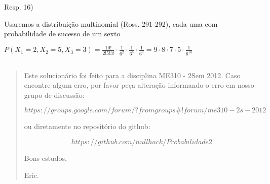 \documentclass[portuguese]{article}
\begin{document}
Resp. 16)

Usaremos a distribuição multinomial (Ross. 291-292), cada uma com
probabilidade de sucesso de um sexto

$P(X_{1}=2,X_{2}=5,X_{3}=3)=\frac{10!}{2!5!3!}\cdot\frac{1}{6^{2}}\cdot\frac{1}{6^{5}}\cdot\frac{1}{6^{3}}=9\cdot8\cdot7\cdot5\cdot\frac{1}{6^{10}}$


\subsection*{\textcompwordmark{}}


\subsection*{\pagebreak{}}
\begin{quotation}
Este solucionário foi feito para a disciplina ME310 - 2Sem 2012. Caso
encontre algum erro, por favor peça alteração informando o erro em
nosso grupo de discussão: 

$$https://groups.google.com/forum/?fromgroups\#!forum/me310-2s-2012$$

ou diretamente no repositório do github:

$$https://github.com/nullhack/Probabilidade2$$

Bons estudos,

Eric.\end{quotation}
\end{document}
